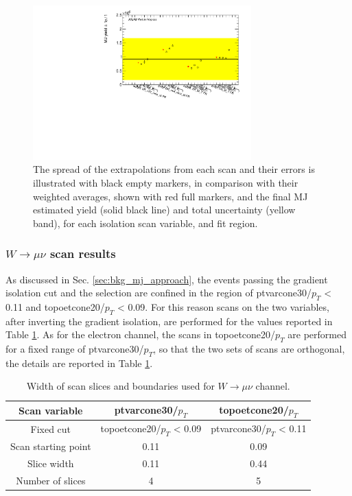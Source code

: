 \begin{figure}[htbp]
\centering
\includegraphics[width=0.75\textwidth]{figures/mj/spread_mj_el.pdf}
\caption{
 The spread of the extrapolations from each scan and their errors is illustrated with black empty markers, in comparison with their weighted averages, shown with red full markers, and the final MJ estimated yield (solid black line) and total uncertainty (yellow band), for each isolation scan variable, and fit region.
}
\label{fig:mj_spread_extrapolations}
\end{figure}

\subsubsection{$W\rightarrow\mu\nu$ scan results}
\label{sec:bkg_mj_wmu_scan}

As discussed in Sec. \ref{sec:bkg_mj_approach}, the events passing the gradient isolation cut and the selection are confined in the region of ptvarcone30/$p_T$ < 0.11 and topoetcone20/$p_T$ < 0.09. 
For this reason scans on the two variables, after inverting the gradient isolation, are performed for the values reported in Table \ref{tbl:bkg_mj_wmu_scan}. 
As for the electron channel, the scans in topoetcone20/$p_T$ are performed for a fixed range of ptvarcone30/$p_T$, so that the two sets of scans are orthogonal, the details are reported in Table \ref{tbl:bkg_mj_wmu_scan}.

\begin{table}[htbp]
\small
\begin{center}
 \begin{tabular}{ | c | c | c | } 
 \hline
 Scan variable & ptvarcone30/$p_T$ & topoetcone20/$p_T$ \\
 \hline 
 Fixed cut & topoetcone20/$p_T$ < 0.09 & ptvarcone30/$p_T$ < 0.11  \\
 \hline 
 Scan starting point & 0.11 & 0.09 \\
 Slice width & 0.11 & 0.44 \\
 Number of slices & 4 & 5 \\
 \hline 
\end{tabular}
\caption{
Width of scan slices and boundaries used for $W\rightarrow \mu\nu$ channel.
}%
\label{tbl:bkg_mj_wmu_scan}
\end{center}
\end{table}

